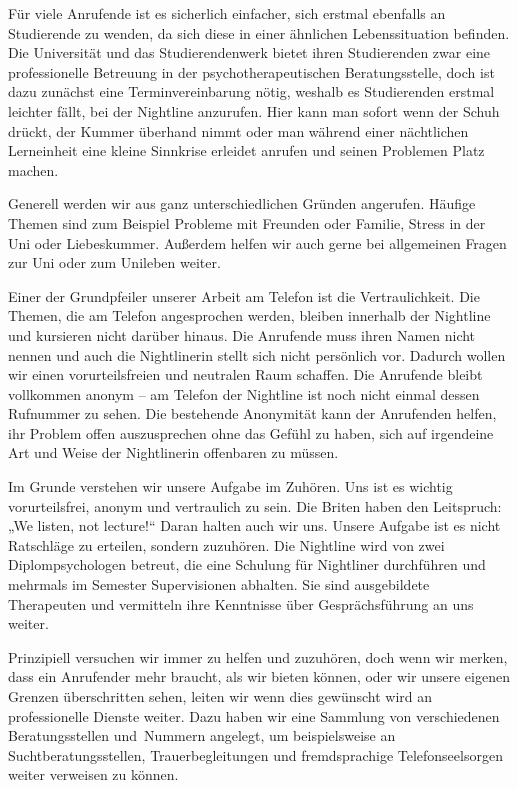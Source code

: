 Für viele Anrufende ist es sicherlich einfacher, sich erstmal ebenfalls an Studierende zu wenden, da sich diese in einer ähnlichen Lebenssituation befinden. Die Universität und das Studierendenwerk bietet ihren Studierenden zwar eine professionelle Betreuung in der psychotherapeutischen Beratungsstelle, doch ist dazu zunächst eine Terminvereinbarung nötig, weshalb es Studierenden erstmal leichter fällt, bei der Nightline anzurufen. Hier kann man sofort wenn der Schuh drückt, der Kummer überhand nimmt oder man während einer nächtlichen Lerneinheit eine kleine Sinnkrise erleidet anrufen und seinen Problemen Platz machen.

Generell werden wir aus ganz unterschiedlichen Gründen angerufen. Häufige Themen sind zum Beispiel Probleme mit Freunden oder Familie, Stress in der Uni oder Liebeskummer. Außerdem helfen wir auch gerne bei allgemeinen Fragen zur Uni oder zum Unileben weiter.

Einer der Grundpfeiler unserer Arbeit am Telefon ist die Vertraulichkeit. Die Themen, die am Telefon angesprochen werden, bleiben innerhalb der Nightline und kursieren nicht darüber hinaus. Die Anrufende muss ihren Namen nicht nennen und auch die Nightlinerin stellt sich nicht persönlich vor. Dadurch wollen wir einen vorurteilsfreien und neutralen Raum schaffen. Die Anrufende bleibt vollkommen anonym – am Telefon der Nightline ist noch nicht einmal dessen Rufnummer zu sehen. Die bestehende Anonymität kann der Anrufenden helfen, ihr Problem offen auszusprechen ohne das Gefühl zu haben, sich auf irgendeine Art und Weise der Nightlinerin offenbaren zu müssen.

Im Grunde verstehen wir unsere Aufgabe im Zuhören. Uns ist es wichtig vorurteilsfrei, anonym und vertraulich zu sein. Die Briten haben den Leitspruch: „We listen, not lecture!“ Daran halten auch wir uns. Unsere Aufgabe ist es nicht Ratschläge zu erteilen, sondern zuzuhören. Die Nightline wird von zwei Diplompsychologen betreut, die eine Schulung für Nightliner durchführen und mehrmals im Semester Supervisionen abhalten. Sie sind ausgebildete Therapeuten und vermitteln ihre Kenntnisse über Gesprächsführung an uns weiter.

Prinzipiell versuchen wir immer zu helfen und zuzuhören, doch wenn wir merken, dass ein Anrufender mehr braucht, als wir bieten können, oder wir unsere eigenen Grenzen überschritten sehen, leiten wir wenn dies gewünscht wird an professionelle Dienste weiter. Dazu haben wir eine Sammlung von verschiedenen Beratungsstellen und~Nummern angelegt, um beispielsweise an Suchtberatungsstellen, Trauerbegleitungen und fremdsprachige Telefonseelsorgen weiter verweisen zu können.

